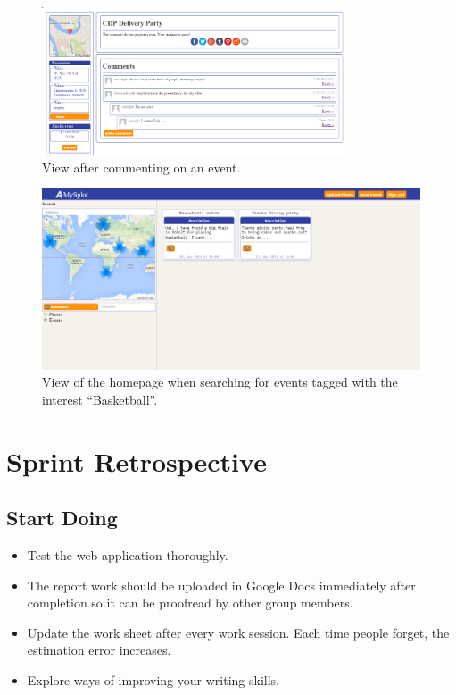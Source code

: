 \begin{figure}[ht!]
  \centering
  \includegraphics[width=90mm]{Sprint5/img/test6.png}
  \caption{View after commenting on an event. }
  \label{fig:S5TestAfterComment}
\end{figure}

\begin{figure}[ht!]
  \centering
  \includegraphics[width=\linewidth]{Sprint5/img/test7.png}
  \caption{View of the homepage when searching for events tagged with the interest ``Basketball''. }
  \label{fig:S5TestAfterComment}
\end{figure}

\newpage
\section{Sprint Retrospective}
\label{sec:S5Retrospective}

\subsection{Start Doing}
\label{subsec:S5RetrospectiveStart}

\begin{itemize}
  \item Test the web application thoroughly.
  \item The report work should be uploaded in Google Docs immediately after completion so it can be proofread by other group members.
  \item Update the work sheet after every work session. Each time people forget, the estimation error increases. 
  \item Explore ways of improving your writing skills. 
\end{itemize}

